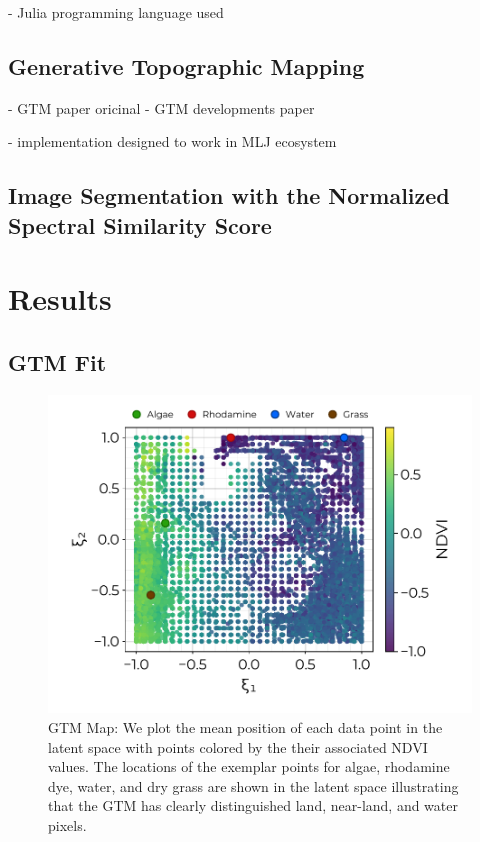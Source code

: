 \documentclass[remotesensing,article,submit,pdftex,moreauthors]{Definitions/mdpi}
\begin{document}
- Julia programming language used \cite{bezanson2012julia}

\subsection{Generative Topographic Mapping}

- GTM paper oricinal \cite{gtm-bishop-1}
- GTM developments paper \cite{gtm-biship-2}

- implementation designed to work in MLJ ecosystem \cite{blaom2020mlj}


\subsection{Image Segmentation with the Normalized Spectral Similarity Score}

\section{Results}

\subsection{GTM Fit}

\begin{figure}[t]
\centering
\includegraphics[width=0.8\columnwidth]{paper/figures/results/square-ndvi.pdf}
\caption{GTM Map: We plot the mean position of each data point in the latent space with points colored by the their associated NDVI values. The locations of the exemplar points for algae, rhodamine dye, water, and dry grass are shown in the latent space illustrating that the GTM has clearly distinguished land, near-land, and water pixels.\label{fig:}}
\end{figure}  
\end{document}
